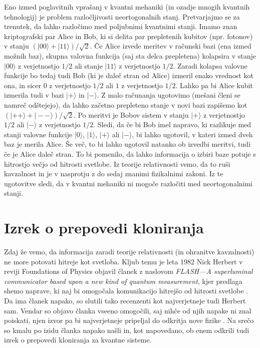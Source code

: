 \documentclass[12pt]{article}
\begin{document}
Eno izmed poglavitnih vprašanj v kvantni mehaniki (in ozadje mnogih kvantnih tehnologij) je problem razločljivosti neortogonalnih stanj. Pretvarjajmo se za trenutek, da lahko razločimo med poljubnimi kvantnimi stanji. Imamo znan kriptografski par Alice in Bob, ki si delita par prepletenih kubitov (npr. fotonov) v stanju $ ( | 00 \rangle + | 11 \rangle ) / \sqrt{2}$. Če Alice izvede meritev v računski bazi (ena izmed možnih baz), skupna valovna funkcija (saj sta delca prepletena) kolapsira v stanje $| 00 \rangle$ z verjetnostjo $1/2$ ali stanje $| 11 \rangle$ z verjetnostjo $1/2$. Zaradi kolapsa valovne funkcije bo tedaj tudi Bob (ki je daleč stran od Alice) izmeril enako vrednost kot ona, in sicer $ 0 $ z verjetnostjo $1/2$ ali $ 1 $ z verjetnostjo $1/2$. Lahko pa bi Alice kubit izmerila tudi v bazi $| + \rangle$ in $| - \rangle$. Z malo računanja ugotovimo (mešani členi se namreč odštejejo), da lahko začetno prepleteno stanje v novi bazi zapišemo kot $ ( | ++ \rangle + | -- \rangle ) / \sqrt{2} $. Po meritvi je Bobov sistem   v stanju $| + \rangle $ z verjetnostjo $1/2$ ali $| - \rangle $ z verjetnostjo $1/2$. Sledi, da če bi Bob imel napravo, ki razlikuje med stanji valovne funkcije  $| 0 \rangle$, $| 1 \rangle$, $|+ \rangle$ ali $| - \rangle$, bi lahko ugotovil, v kateri izmed dveh baz je merila Alice. Še več, to bi lahko ugotovil natanko ob izvedbi meritvi, tudi če je Alice daleč stran. To bi pomenilo, da lahko informacija o izbiri baze potuje s hitrostjo večjo od hitrosti svetlobe. Iz teorije relativnosti vemo, da to ruši kavzalnost in je v nasprotju z do sedaj znanimi fizikalnimi zakoni. Iz te ugotovitve sledi, da v kvantni mehaniki ni mogoče razločiti med neortogonalnimi stanji. \cite{nielsenQuantumComputationQuantum2012}  
 
 \section{Izrek o prepovedi kloniranja}
   Zdaj že vemo, da informacija zaradi teorije relativnosti (in ohranitve kavzalnosti) ne more potovati hitreje kot svetloba. Kljub temu je leta 1982 Nick Herbert v reviji Foundations of Physics objavil članek z naslovom \emph{FLASH—A superluminal communicator based upon a new kind of quantum measurement}, kjer predlaga shemo naprave, ki naj bi omogočala komunikacijo hitrejšo od hitrosti svetlobe \cite{herbertFLASHSuperluminalCommunicator1982}. Da ima članek napako, so slutili tako recenzenti kot najverjetneje tudi Herbert sam. Vendar so objavo članka vseeno omogočili, saj nihče od njih napake ni znal poiskati, njen izvor pa bi najverjetneje pripeljal do odkritja nove fizike \cite{peresHowNocloningTheorem2003}. Na srečo so kmalu po izidu članka napako našli \cite{woottersSingleQuantumCannot1982} in, kot napovedano, ob enem odkrili tudi izrek o prepovedi kloniranja za kvantne sisteme.
\end{document}
